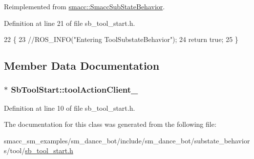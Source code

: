 Reimplemented from \hyperlink{classsmacc_1_1SmaccSubStateBehavior_ab78b9de76c04a7ab6c16d5924e216ef9}{smacc\+::\+Smacc\+Sub\+State\+Behavior}.



Definition at line 21 of file sb\+\_\+tool\+\_\+start.\+h.


\begin{DoxyCode}
22     \{
23       \textcolor{comment}{//ROS\_INFO("Entering ToolSubstateBehavior");}
24       \textcolor{keywordflow}{return} \textcolor{keyword}{true};
25     \}
\end{DoxyCode}


\subsection{Member Data Documentation}
\subsubsection[{\texorpdfstring{tool\+Action\+Client\+\_\+}{toolActionClient_}}]{$\ast$ Sb\+Tool\+Start\+::tool\+Action\+Client\+\_\+}\hypertarget{classSbToolStart_ade218adc9ad0c00accf947dffdcd1a33}{}\label{classSbToolStart_ade218adc9ad0c00accf947dffdcd1a33}


Definition at line 10 of file sb\+\_\+tool\+\_\+start.\+h.



The documentation for this class was generated from the following file\+:\begin{DoxyCompactItemize}
\item 
smacc\+\_\+sm\+\_\+examples/sm\+\_\+dance\+\_\+bot/include/sm\+\_\+dance\+\_\+bot/substate\+\_\+behaviors/tool/\hyperlink{sb__tool__start_8h}{sb\+\_\+tool\+\_\+start.\+h}\end{DoxyCompactItemize}
